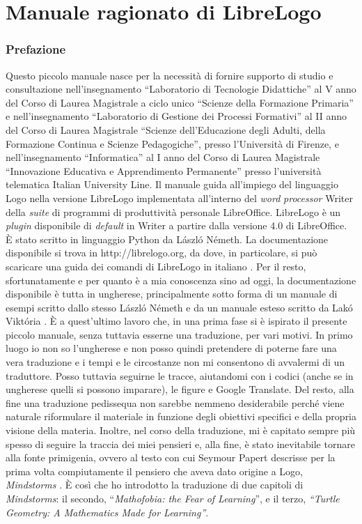 \part{Manuale ragionato di LibreLogo} \label{parte:manuale}

\section{Prefazione}
Questo piccolo manuale nasce per la necessità di fornire supporto di studio e
consultazione nell'insegnamento “Laboratorio di Tecnologie Didattiche” al V
anno del Corso di Laurea Magistrale a ciclo unico “Scienze della Formazione
Primaria” e nell'insegnamento “Laboratorio di Gestione dei Processi Formativi”
al II anno del Corso di Laurea Magistrale “Scienze dell'Educazione degli
Adulti, della Formazione Continua e Scienze Pedagogiche”, presso l'Università
di Firenze, e nell'insegnamento “Informatica” al I anno del Corso di Laurea
Magistrale “Innovazione Educativa e Apprendimento Permanente” presso
l'università telematica Italian University Line. Il manuale guida all'impiego
del linguaggio Logo nella versione LibreLogo implementata all'interno del \textit{word}
\textit{processor} Writer della \textit{suite} di programmi di produttività personale
LibreOffice. LibreLogo è un \textit{plugin} disponibile di \textit{default} in Writer a partire
dalla versione 4.0 di LibreOffice. È stato scritto in linguaggio Python da
László Németh. La documentazione disponibile si trova in http://librelogo.org,
da dove, in particolare, si può scaricare una guida dei comandi di LibreLogo in
italiano \cite{LibreLogo}. Per il resto, sfortunatamente e per quanto è a mia conoscenza sino ad oggi, la documentazione disponibile è tutta in ungherese, principalmente sotto forma di un manuale di esempi scritto dallo stesso László Németh \cite{LibreLogo2} e da un manuale esteso scritto da Lakó Viktória \cite{LibreLogo3}. È a quest'ultimo lavoro che, in una prima fase si è ispirato il presente piccolo manuale, senza tuttavia esserne una traduzione, per vari motivi. In primo luogo io non so l'ungherese e non posso quindi pretendere di poterne fare una vera traduzione e i tempi e le circostanze non mi consentono di avvalermi di un traduttore. Posso tuttavia seguirne le tracce, aiutandomi con i codici (anche se in ungherese quelli si possono imparare), le figure e Google Translate. Del resto, alla fine una traduzione pedissequa non sarebbe nemmeno desiderabile perché viene naturale riformulare il materiale in funzione degli obiettivi specifici e della propria visione della materia. Inoltre, nel corso della traduzione, mi è capitato sempre più spesso di seguire la traccia dei miei pensieri e, alla fine, è stato inevitabile tornare alla fonte primigenia, ovvero al testo con cui Seymour Papert descrisse per la prima volta compiutamente il pensiero che aveva dato origine a Logo, \textit{Mindstorms} \cite{Papert}. È così che ho introdotto la traduzione di due capitoli di \textit{Mindstorms}: il secondo, “\textit{Mathofobia: the Fear of Learning}”, e il terzo, \textit{“Turtle Geometry: A Mathematics Made for Learning”}.

